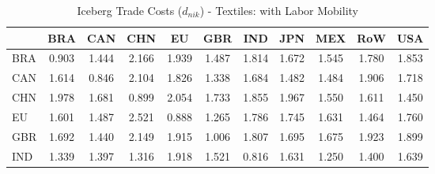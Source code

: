 \begin{table}[htbp]
\centering
\caption{Iceberg Trade Costs ($d_{nik}$) - Textiles: with Labor Mobility} 
\label{tab:iceberg_Textiles}
\begin{tabular}{lcccccccccc}
  \hline
 & BRA & CAN & CHN & EU & GBR & IND & JPN & MEX & RoW & USA \\ 
  \hline
BRA & \textcolor[RGB]{237,153,18}{0.903} & \textcolor[RGB]{186,120,69}{1.444} & \textcolor[RGB]{8,5,247}{2.166} & \textcolor[RGB]{23,15,232}{1.939} & \textcolor[RGB]{168,109,87}{1.487} & \textcolor[RGB]{51,33,204}{1.814} & \textcolor[RGB]{105,68,150}{1.672} & \textcolor[RGB]{138,89,117}{1.545} & \textcolor[RGB]{61,40,194}{1.780} & \textcolor[RGB]{46,30,209}{1.853} \\ 
  CAN & \textcolor[RGB]{120,78,135}{1.614} & \textcolor[RGB]{247,160,8}{0.846} & \textcolor[RGB]{13,8,242}{2.104} & \textcolor[RGB]{48,31,207}{1.826} & \textcolor[RGB]{204,132,51}{1.338} & \textcolor[RGB]{97,63,158}{1.684} & \textcolor[RGB]{176,114,79}{1.482} & \textcolor[RGB]{171,111,84}{1.484} & \textcolor[RGB]{36,23,219}{1.906} & \textcolor[RGB]{79,51,176}{1.718} \\ 
  CHN & \textcolor[RGB]{18,12,237}{1.978} & \textcolor[RGB]{99,64,156}{1.681} & \textcolor[RGB]{240,155,15}{0.899} & \textcolor[RGB]{15,10,240}{2.054} & \textcolor[RGB]{71,46,184}{1.733} & \textcolor[RGB]{43,28,212}{1.855} & \textcolor[RGB]{20,13,235}{1.967} & \textcolor[RGB]{133,86,122}{1.550} & \textcolor[RGB]{122,79,133}{1.611} & \textcolor[RGB]{184,119,71}{1.450} \\ 
  EU & \textcolor[RGB]{125,81,130}{1.601} & \textcolor[RGB]{166,107,89}{1.487} & \textcolor[RGB]{0,0,255}{2.521} & \textcolor[RGB]{242,157,13}{0.888} & \textcolor[RGB]{219,142,36}{1.265} & \textcolor[RGB]{59,38,196}{1.786} & \textcolor[RGB]{66,43,189}{1.745} & \textcolor[RGB]{115,74,140}{1.631} & \textcolor[RGB]{181,117,74}{1.464} & \textcolor[RGB]{64,41,191}{1.760} \\ 
  GBR & \textcolor[RGB]{89,58,166}{1.692} & \textcolor[RGB]{189,122,66}{1.440} & \textcolor[RGB]{10,7,245}{2.149} & \textcolor[RGB]{33,21,222}{1.915} & \textcolor[RGB]{230,148,26}{1.006} & \textcolor[RGB]{54,35,201}{1.807} & \textcolor[RGB]{87,56,168}{1.695} & \textcolor[RGB]{102,66,153}{1.675} & \textcolor[RGB]{28,18,227}{1.923} & \textcolor[RGB]{38,25,217}{1.899} \\ 
  IND & \textcolor[RGB]{201,130,54}{1.339} & \textcolor[RGB]{196,127,59}{1.397} & \textcolor[RGB]{212,137,43}{1.316} & \textcolor[RGB]{31,20,224}{1.918} & \textcolor[RGB]{150,97,105}{1.521} & \textcolor[RGB]{250,162,5}{0.816} & \textcolor[RGB]{117,76,138}{1.631} & \textcolor[RGB]{222,144,33}{1.250} & \textcolor[RGB]{194,125,61}{1.400} & \textcolor[RGB]{112,73,143}{1.639} \\ 

\end{tabular}
\end{table}
